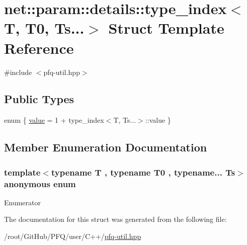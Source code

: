 \hypertarget{structnet_1_1param_1_1details_1_1type__index_3_01T_00_01T0_00_01Ts_8_8_8_4}{\section{net\-:\-:param\-:\-:details\-:\-:type\-\_\-index$<$ T, T0, Ts...$>$ Struct Template Reference}
\label{structnet_1_1param_1_1details_1_1type__index_3_01T_00_01T0_00_01Ts_8_8_8_4}
}


{\ttfamily \#include $<$pfq-\/util.\-hpp$>$}

\subsection*{Public Types}
\begin{DoxyCompactItemize}
\item 
enum \{ \hyperlink{structnet_1_1param_1_1details_1_1type__index_3_01T_00_01T0_00_01Ts_8_8_8_4_a0e1958d65adb96b5b73afd41372b1a8fac571d4fccf6873682c31e1fa9dd70e56}{value} = 1 + type\-\_\-index$<$T, Ts...$>$\-:\-:value
 \}
\end{DoxyCompactItemize}


\subsection{Member Enumeration Documentation}
\hypertarget{structnet_1_1param_1_1details_1_1type__index_3_01T_00_01T0_00_01Ts_8_8_8_4_a0e1958d65adb96b5b73afd41372b1a8f}{\subsubsection[{anonymous enum}]{\setlength{\rightskip}{0pt plus 5cm}template$<$typename T , typename T0 , typename... Ts$>$ anonymous enum}}\label{structnet_1_1param_1_1details_1_1type__index_3_01T_00_01T0_00_01Ts_8_8_8_4_a0e1958d65adb96b5b73afd41372b1a8f}
\begin{Desc}
\item[Enumerator]\par
\begin{description}
\item[{\em 
\hypertarget{structnet_1_1param_1_1details_1_1type__index_3_01T_00_01T0_00_01Ts_8_8_8_4_a0e1958d65adb96b5b73afd41372b1a8fac571d4fccf6873682c31e1fa9dd70e56}{value}\label{structnet_1_1param_1_1details_1_1type__index_3_01T_00_01T0_00_01Ts_8_8_8_4_a0e1958d65adb96b5b73afd41372b1a8fac571d4fccf6873682c31e1fa9dd70e56}
}]\end{description}
\end{Desc}


The documentation for this struct was generated from the following file\-:\begin{DoxyCompactItemize}
\item 
/root/\-Git\-Hub/\-P\-F\-Q/user/\-C++/\hyperlink{pfq-util_8hpp}{pfq-\/util.\-hpp}\end{DoxyCompactItemize}
